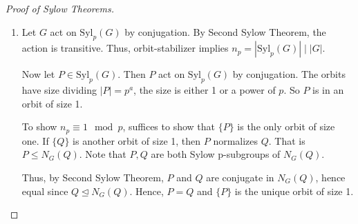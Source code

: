 \begin{proof}[Proof of Sylow Theorems]
\begin{enumerate}
        Since \(\left\vert \nicefrac{G}{P} \right\vert = m\) is coprime to \(p\), there must exist an orbit of size 1. That is, there exists \(g \in G\) such that \(qgP = gP\) for all \(q\). So \(g^{-1}qg \in P\) for all \(q \in Q\). So \(Q \leq gPg^{-1}\).
        \item Let \(G\) act on \(\mathrm{Syl}_p(G)\) by conjugation. By Second Sylow Theorem, the action is transitive. Thus, orbit-stabilizer implies \(n_p = \left\vert \mathrm{Syl}_p(G) \right\vert\mid \left\vert G \right\vert \).

        Now let \(P \in \mathrm{Syl}_p(G)\). Then \(P\) act on \(\mathrm{Syl}_p(G)\) by conjugation. The orbits have size dividing \(\left\vert P \right\vert = p^a\), the size is either 1 or a power of \(p\). So \(P\) is in an orbit of size 1.

        To show \(n_p \equiv 1 \mod p\), suffices to show that \(\{P\}\) is the only orbit of size one. If \(\{Q\}\) is another orbit of size 1, then \(P\) normalizes \(Q\). That is \(P \leq N_G(Q)\). Note that \(P,Q\) are both Sylow p-subgroups of \(N_G(Q)\).

        Thus, by Second Sylow Theorem, \(P\) and \(Q\) are conjugate in \(N_G(Q)\), hence equal since \(Q \trianglelefteq N_G(Q)\). Hence, \(P = Q\) and \(\{P\}\) is the unique orbit of size 1.
    \end{enumerate}
\end{proof}